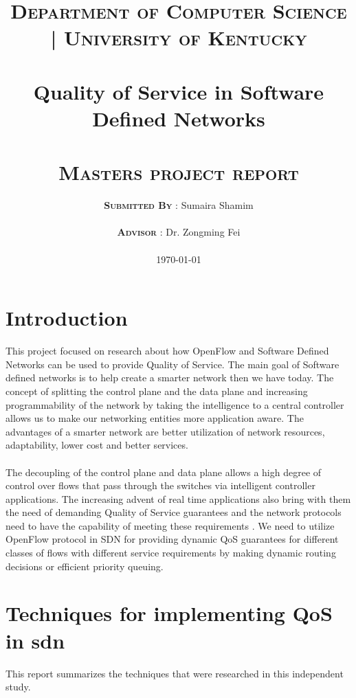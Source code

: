 \documentclass[paper=a4, fontsize=11pt]{scrartcl}	%
\title{
		\usefont{OT1}{bch}{b}{n}
		\normalfont \normalsize \textsc{\textbf{Department of Computer Science | University of Kentucky}} \\ [28pt]
		\horrule{0.5pt} \\[0.4cm]
		\huge Quality of Service in Software Defined Networks\\
		\horrule{2pt} \\[0.5cm]
		\normalfont \normalsize \textsc{\textbf{Masters project report}}
}
\author{
		\normalfont \normalsize \textsc{\textbf{Submitted By}} 
		\normalfont 								\normalsize
       	{: Sumaira Shamim}\\[-3pt]		\normalsize \\
       	\normalfont \normalsize \textsc{\textbf{Advisor}} 
       	\normalfont 								\normalsize
       	{: Dr. Zongming Fei}\\[-3pt]		\normalsize \\
  \today      
}
\date{}
\numberwithin{equation}{section}		%
\numberwithin{figure}{section}			%
\numberwithin{table}{section}				%
\begin{document}
\maketitle
\thispagestyle{empty}

\newpage
\setcounter{page}{1}
\tableofcontents
\newpage
\section{Introduction}
This project focused on research about how OpenFlow and Software Defined Networks can be used to provide Quality of Service. The main goal of Software defined networks is to help create a smarter network then we have today. The concept of splitting the control plane and the data plane and increasing programmability of the network by taking the intelligence to a central controller allows us to make our networking entities more application aware. The advantages of a smarter network are better utilization of network resources, adaptability, lower cost and better services. 
\\
\\
The decoupling of the control plane and data plane allows a high degree of control over flows that pass through the switches via intelligent controller applications. The increasing advent of real time applications also bring with them the need of demanding Quality of Service guarantees and the network protocols need to have the capability of meeting these requirements \cite{thesis}. We need to utilize OpenFlow protocol in SDN for providing dynamic QoS guarantees for different classes of flows with different service requirements by making dynamic routing decisions or efficient priority queuing. 
\section{Techniques for implementing QoS in sdn}
This report summarizes the techniques that were researched in this independent study.
\end{document}
